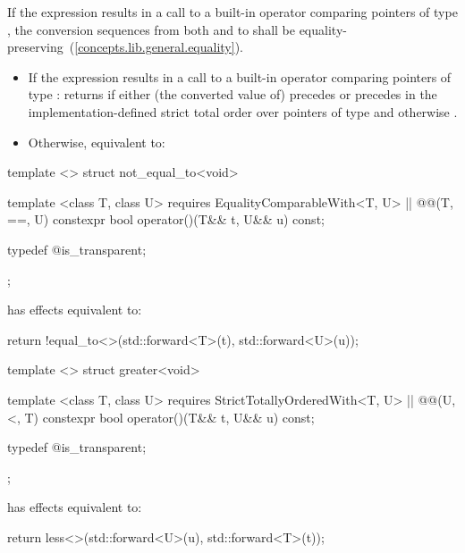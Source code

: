\begin{itemdescr}
\pnum
\requires If the expression 
results in a call to a built-in operator \tcode{==} comparing pointers of type
, the conversion sequences from both  and  to 
shall be equality-preserving~(\ref{concepts.lib.general.equality}).

\pnum
\effects
\begin{itemize}
\item
If the expression  results in a
call to a built-in operator \tcode{==} comparing pointers of type :
returns  if either (the converted value of)  precedes
 or  precedes  in the implementation-defined strict
total order over pointers of type  and otherwise .

\item
Otherwise, equivalent to: 
\end{itemize}
\end{itemdescr}

%
\begin{itemdecl}
template <> struct not_equal_to<void> {
  template <class T, class U>
    requires EqualityComparableWith<T, U> || @\textit{}@(T, ==, U)
  constexpr bool operator()(T&& t, U&& u) const;

  typedef @\unspec@ is_transparent;
};
\end{itemdecl}

\begin{itemdescr}
\pnum
{} has effects equivalent to:
\begin{codeblock}
return !equal_to<>{}(std::forward<T>(t), std::forward<U>(u));
\end{codeblock}
\end{itemdescr}

%
\begin{itemdecl}
template <> struct greater<void> {
  template <class T, class U>
    requires StrictTotallyOrderedWith<T, U> || @\textit{}@(U, <, T)
  constexpr bool operator()(T&& t, U&& u) const;

  typedef @\unspec@ is_transparent;
};
\end{itemdecl}

\begin{itemdescr}
\pnum
{} has effects equivalent to:
\begin{codeblock}
return less<>{}(std::forward<U>(u), std::forward<T>(t));
\end{codeblock}
\end{itemdescr}

